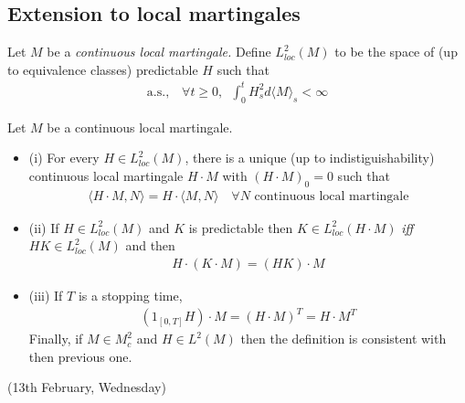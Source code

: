 \documentclass[12pt,a4paper]{article}
\renewenvironment{i}
{\begin{itemize} 
	}%
	{\end{itemize}
}
\begin{document}
\subsection{Extension to local martingales}

 Let $M$ be a \emph{continuous local martingale.} Define $L_{loc}^2(M)$ to be the space of (up to equivalence classes) predictable $H$ such that
\begin{align*}
\text{a.s.,} \quad \forall t\geq 0,\,\,\, \int_0^t H_s^2 d \langle M \rangle_s < \infty 
\end{align*}
\s

\thm Let $M$ be a continuous local martingale.
\begin{i}
\item[(i)] For every $H \in L^2_{loc}(M)$, there is a unique (up to indistiguishability) continuous local martingale $H\cdot M$ with $(H\cdot M)_0 =0$ such that
\begin{align*}
\langle H \cdot M, N \rangle = H \cdot \langle M, N\rangle \quad \forall N \text{ continuous local martingale}
\end{align*}
\item[(ii)] If $H\in L_{loc}^2(M)$ and $K$ is predictable then $K\in L^2_{loc}(H \cdot M)$ \emph{iff} $HK\in L^2_{loc}(M)$ and then
\begin{align*}
H \cdot (K \cdot M) = (HK) \cdot M
\end{align*}
\item[(iii)] If $T$ is a stopping time,
\begin{align*}
(1_{[0, T]} H)\cdot M = (H \cdot M)^T = H\cdot M^T
\end{align*}
Finally, if $M\in M^2_c$ and $H\in L^2(M)$ then the definition is consistent with then previous one. 
\end{i}
\s

\newday

(13th February, Wednesday)
\s
\end{document}
